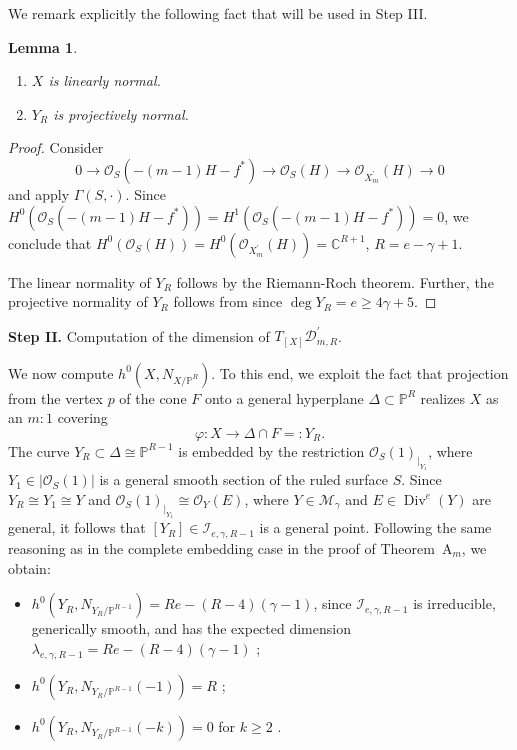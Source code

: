\documentclass[a4paper,12pt]{amsart}
\newtheorem{lemma}[thm]{Lemma}
\def\Div{\operatorname{Div}}%
\begin{document}
We remark explicitly the following fact that will be used in {\rm Step III}.

\begin{lemma}\label{Sec5_Lemma_Y_is_proj_norm}
\begin{enumerate}[label=(\roman*), leftmargin=*, font=\rmfamily]
 \item $X$ is linearly normal.

 \item $Y_R$ is projectively normal.
\end{enumerate}
\end{lemma}
\begin{proof}
Consider
\[
 0 \to \mathcal{O}_S (-(m-1)H - f^{\ast}) \to \mathcal{O}_S (H) \to \mathcal{O}_{X^{\prime}_m} (H) \to 0
\]
and apply $\Gamma (S, \cdot)$. Since $H^0 (\mathcal{O}_S (-(m-1)H - f^{\ast})) = H^1 (\mathcal{O}_S (-(m-1)H - f^{\ast})) = 0$, we conclude that $H^0 (\mathcal{O}_S (H)) = H^0 (\mathcal{O}_{X^{\prime}_m} (H)) = \mathbb{C}^{R+1}$, $R = e-\gamma + 1$.

The linear normality of $Y_R$ follows by the Riemann-Roch theorem. Further, the projective normality of $Y_R$ follows from \cite{GL86} since $\deg Y_R = e \geq 4\gamma + 5$.
\end{proof}

\medskip

{\bf Step II.} Computation of the dimension of $T_{[X]} \mathcal{D}^{\prime}_{m,R}$.

We now compute $h^0 (X, N_{X/\mathbb{P}^R})$. To this end, we exploit the fact that projection from the vertex $p$ of the cone $F$ onto a general hyperplane $\Delta \subset \mathbb{P}^R$ realizes $X$ as an $m:1$ covering
\[
 \varphi : X \to \Delta \cap F =: Y_R .
\]
The curve $Y_R \subset \Delta \cong \mathbb{P}^{R-1}$ is embedded by the restriction ${\mathcal{O}_S (1)}_{|_{Y_1}}$, where $Y_1 \in |\mathcal{O}_S (1)|$ is a general smooth section of the ruled surface $S$. Since $Y_R \cong Y_1 \cong Y$ and ${\mathcal{O}_S (1)}_{|_{Y_1}} \cong \mathcal{O}_Y (E)$, where $Y \in \mathcal{M}_{\gamma}$ and $E \in \Div^{e} (Y)$ are general, it follows that $[Y_R] \in \mathcal{I}_{e, \gamma, R-1}$ is a general point. Following the same reasoning as in the complete embedding case in the proof of \textnormal{Theorem~A$_m$}, we obtain:
\begin{itemize}
 \item $h^0 (Y_R, N_{Y_R/ \mathbb{P}^{R-1}}) = Re - (R-4)(\gamma - 1)$, since $\mathcal{I}_{e, \gamma, R-1}$ is irreducible, generically smooth, and has the expected dimension $\lambda_{e, \gamma, R-1} = Re - (R-4)(\gamma - 1)$ ;

 \item $h^0 (Y_R, N_{Y_R/ \mathbb{P}^{R-1}} (-1)) = R$ ;

 \item $h^0 (Y_R, N_{Y_R/ \mathbb{P}^{R-1}} (-k)) = 0$ for $k \geq 2$ .
\end{itemize}
\end{document}
